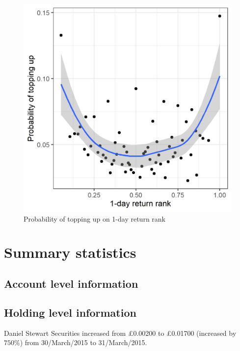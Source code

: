 \documentclass[12pt]{article}
\begin{document}
\begin{figure}[h]
	\includegraphics[scale=0.7]{figure_probtopup_1dayreturnrank}
	\centering
	\caption{Probability of topping up on 1-day return rank}
\end{figure}


\newpage

\section{Summary statistics}

 \subsection{Account level information}
 

 
 \subsection{Holding level information}



Daniel Stewart Securities increased from \pounds0.00200 to \pounds0.01700 (increased by $750\%$) from 30/March/2015 to 31/March/2015.

\newpage
\end{document}
